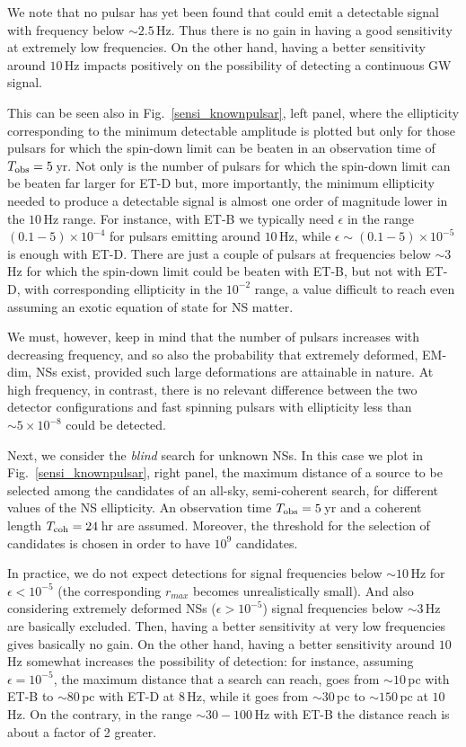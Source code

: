 We note that no pulsar has yet been found that could emit a
detectable signal with frequency below $\sim 2.5\,$Hz. Thus there
is no gain in having a good sensitivity at extremely low frequencies. On the
other hand, having a better sensitivity around $10\,$Hz impacts positively on
the possibility of detecting a continuous GW signal.

This can be seen also in Fig.~\ref{sensi_knownpulsar}, left panel, where the
ellipticity corresponding to the minimum detectable amplitude is plotted but
only for those pulsars for which the spin-down limit can be beaten in
an observation time of $T_{\rm obs}=5$\,yr. Not only is the number of pulsars for which
the spin-down limit can be beaten far larger for ET-D
but, more importantly, the minimum ellipticity needed to produce a detectable
signal is almost one order of magnitude lower in the $10\,$Hz range.
For instance, with ET-B we typically need $\epsilon$ in the
range $(0.1-5)\times 10^{-4}$ for pulsars emitting around $10\,$Hz, while $\epsilon
\sim (0.1-5)\times 10^{-5}$ is enough with ET-D. There are just a couple of pulsars
at frequencies below $\sim 3\,$Hz for which the spin-down limit could be
beaten with ET-B, but not with ET-D, with corresponding ellipticity in the
$10^{-2}$ range, a value difficult to reach even assuming an exotic equation
of state for NS matter. 

We must, however, keep in mind that the number of pulsars increases with decreasing 
frequency, and so also the probability that
extremely deformed, EM-dim, NSs exist, provided such large
deformations are attainable in nature.
At high frequency, in contrast, there is no relevant difference 
between the two detector configurations and fast spinning pulsars with 
ellipticity less than $\sim5 \times 10^{-8}$ could be detected.

Next, we consider the \emph{blind} search for unknown NSs. In 
this case we plot in Fig.~\ref{sensi_knownpulsar}, right panel, the maximum distance of a 
source to be selected among the candidates of an all-sky, semi-coherent search,
for different values of the NS ellipticity. An
observation time $T_{\rm obs}=5$\,yr and a coherent length 
$T_{\rm coh}=24$\,hr are assumed. Moreover,
the threshold for the selection of candidates is chosen in order to have
$10^9$ candidates.

In practice, we do not expect detections for signal frequencies below
$\sim 10\,$Hz for $\epsilon<10^{-5}$ (the
corresponding $r_{max}$ becomes unrealistically small). And also
considering extremely deformed NSs ($\epsilon> 10^{-5}$)
signal frequencies below $\sim 3\,$Hz are basically excluded. Then, having
a better sensitivity at very low frequencies gives basically no gain. On the
other hand, having a better sensitivity around $10\,$Hz somewhat increases
the possibility of detection: for instance, assuming
$\epsilon=10^{-5}$, the maximum
distance that a search can reach, goes from $\sim 10\,$pc with ET-B to
$\sim 80\,$pc with ET-D at $8\,$Hz, while it goes from $\sim
30\,$pc to $\sim 150\,$pc at $10\,$Hz. On the contrary, in the range 
$\sim 30-100$\,Hz with ET-B the distance reach is about a factor of 2 greater. 

